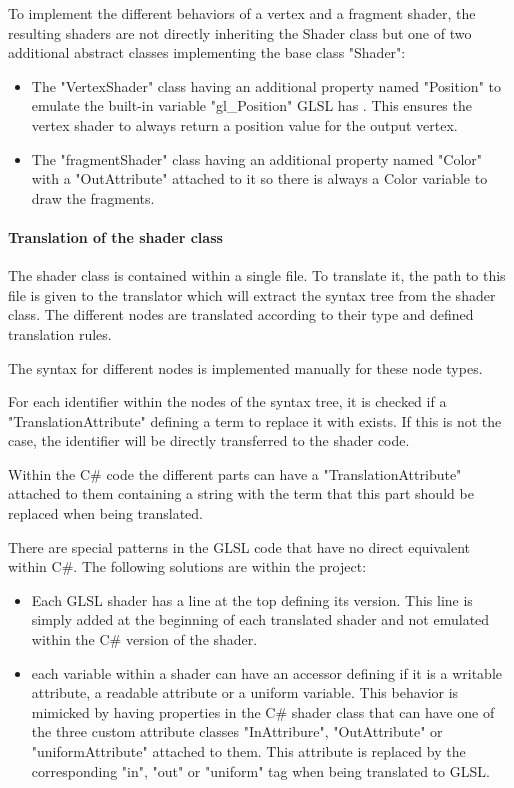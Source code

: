 To implement the different behaviors of a vertex and a fragment shader, the resulting shaders are not directly inheriting the Shader class but one of two additional abstract classes implementing the base class "Shader":
\begin{itemize}
\item The "VertexShader" class having an additional property named "Position" to emulate the built-in variable "gl\_Position" GLSL has . This ensures the vertex shader to always return a position value for the output vertex.
\item The "fragmentShader" class having an additional property named "Color" with a "OutAttribute" attached to it so there is always a Color variable to draw the fragments.
\end{itemize}

\paragraph{Translation of the shader class}

The shader class is contained within a single file. To translate it, the path to this file is given to the translator which will extract the syntax tree from the shader class. The different nodes are translated according to their type and defined translation rules.

The syntax for different nodes is implemented manually for these node types.

For each identifier within the nodes of the syntax tree, it is checked if a "TranslationAttribute" defining a term to replace it with exists. If this is not the case, the identifier will be directly transferred to the shader code.

Within the C\# code the different parts can have a "TranslationAttribute" attached to them containing a string with the term that this part should be replaced when being translated.

There are special patterns in the GLSL code that have no direct equivalent within C\#. The following solutions are within the project:
\begin{itemize}
\item Each GLSL shader has a line at the top defining its version. This line is simply added at the beginning of each translated shader and not emulated within the C\# version of the shader.
\item each variable within a shader can have an accessor defining if it is a writable attribute, a readable attribute or a uniform variable. This behavior is mimicked by having properties in the C\# shader class that can have one of the three custom attribute classes "InAttribure", "OutAttribute" or "uniformAttribute" attached to them. This attribute is replaced by the corresponding "in", "out" or "uniform" tag when being translated to GLSL.
\end{itemize}

